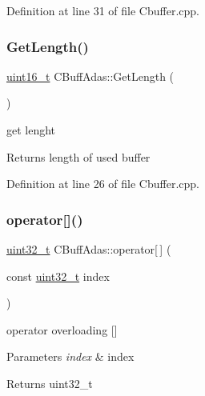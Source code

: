 Definition at line 31 of file Cbuffer.\+cpp.

\mbox{\label{class_c_buff_adas_a493f61488df8ac9f7e942af1a2fbdbf3}} 
\subsubsection{\texorpdfstring{GetLength()}{GetLength()}}
{\footnotesize\ttfamily \mbox{\hyperlink{_a_d_a_s___types_8h_a1f1825b69244eb3ad2c7165ddc99c956}{uint16\+\_\+t}} C\+Buff\+Adas\+::\+Get\+Length (\begin{DoxyParamCaption}{ }\end{DoxyParamCaption})}



get lenght 

\begin{DoxyReturn}{Returns}
length of used buffer 
\end{DoxyReturn}


Definition at line 26 of file Cbuffer.\+cpp.

\mbox{\label{class_c_buff_adas_ae1a6aa5f049b0e1e04950af1c55df3d7}} 
\subsubsection{\texorpdfstring{operator[]()}{operator[]()}}
{\footnotesize\ttfamily \mbox{\hyperlink{_a_d_a_s___types_8h_a06896e8c53f721507066c079052171f8}{uint32\+\_\+t}} C\+Buff\+Adas\+::operator\mbox{[}$\,$\mbox{]} (\begin{DoxyParamCaption}\item[{const \mbox{\hyperlink{_a_d_a_s___types_8h_a06896e8c53f721507066c079052171f8}{uint32\+\_\+t}}}]{index }\end{DoxyParamCaption})}



operator overloading \mbox{[}\mbox{]} 


\begin{DoxyParams}{Parameters}
{\em index} & index \\
\hline
\end{DoxyParams}
\begin{DoxyReturn}{Returns}
uint32\+\_\+t 
\end{DoxyReturn}


